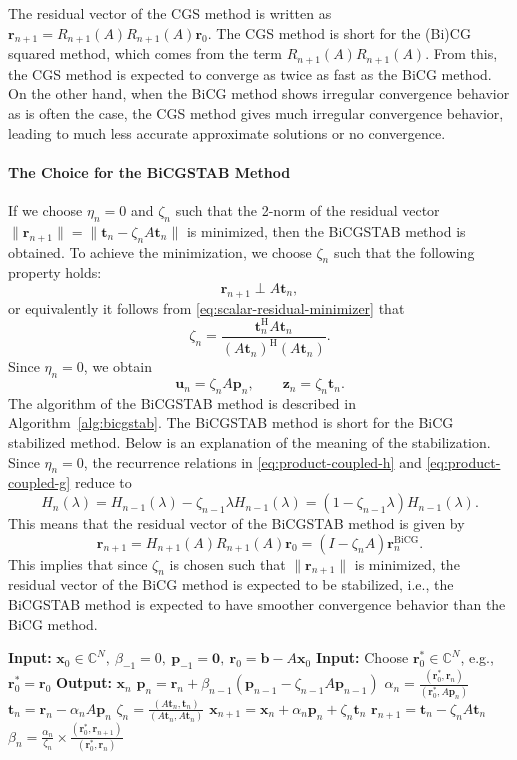{The residual vector of the CGS method is written as $\bm r_{n+1}=R_{n+1}(A)R_{n+1}(A)\bm r_0$. The CGS method is short for the (Bi)CG squared method, which comes from the term $R_{n+1}(A)R_{n+1}(A)$. From this, the CGS method is expected to converge as twice as fast as the BiCG method. On the other hand, when the BiCG method shows irregular convergence behavior as is often the case, the CGS method gives much irregular convergence behavior, leading to much less accurate approximate solutions or no convergence.}
\paragraph{{The Choice for the BiCGSTAB Method}}\label{subsec:bicgstab-parameter-choice}\mbox{}\par
{If we choose $\eta_n=0$ and $\zeta_n$ such that the 2-norm of the residual vector $\|\bm r_{n+1}\|=\|\bm t_n-\zeta_nA\bm t_n\|$ is minimized, then the BiCGSTAB method is obtained. To achieve the minimization, we choose $\zeta_n$ such that the following property holds:}
\[\bm r_{n+1}\perp A\bm t_n,\]
{or equivalently it follows from \eqref{eq:scalar-residual-minimizer} that}
\[\zeta_n=\frac{\bm t_n^{\mathrm H}A\bm t_n}{(A\bm t_n)^{\mathrm H}(A\bm t_n)}.\]
{Since $\eta_n=0$, we obtain}
\[\bm u_n=\zeta_nA\bm p_n,\qquad\bm z_n=\zeta_n\bm t_n.\]
{The algorithm of the BiCGSTAB method is described in Algorithm\ \ref{alg:bicgstab}.}
{The BiCGSTAB method is short for the BiCG stabilized method. Below is an explanation of the meaning of the stabilization. Since $\eta_n=0$, the recurrence relations in \eqref{eq:product-coupled-h} and \eqref{eq:product-coupled-g} reduce to}
\[H_n(\lambda)=H_{n-1}(\lambda)-\zeta_{n-1}\lambda H_{n-1}(\lambda)=(1-\zeta_{n-1}\lambda)H_{n-1}(\lambda).\]
{This means that the residual vector of the BiCGSTAB method is given by}
\[\bm r_{n+1}=H_{n+1}(A)R_{n+1}(A)\bm r_0=(I-\zeta_nA)\bm r_n^{\mathrm{BiCG}}.\]
{This implies that since $\zeta_n$ is chosen such that $\|\bm r_{n+1}\|$ is minimized, the residual vector of the BiCG method is expected to be stabilized, i.e., the BiCGSTAB method is expected to have smoother convergence behavior than the BiCG method.}
\begin{algorithm}[H]\caption{{The BiCGSTAB method}}\label{alg:bicgstab}\begin{algorithmic}[1]
\Statex\textbf{Input:} $\bm x_0\in\mathbb C^N,\ \beta_{-1}=0,\ \bm p_{-1}=\bm0,\ \bm r_0=\bm b-A\bm x_0$
\Statex\textbf{Input:} {Choose $\bm r_0^{*}\in\mathbb C^N$, e.g., $\bm r_0^{*}=\bm r_0$}
\Statex\textbf{Output:} $\bm x_n$
\State $\bm p_n=\bm r_n+\beta_{n-1}(\bm p_{n-1}-\zeta_{n-1}A\bm p_{n-1})$
\State $\alpha_n=\frac{(\bm r_0^{*},\bm r_n)}{(\bm r_0^{*},A\bm p_n)}$
\State $\bm t_n=\bm r_n-\alpha_nA\bm p_n$
\State $\zeta_n=\frac{(A\bm t_n,\bm t_n)}{(A\bm t_n,A\bm t_n)}$
\State $\bm x_{n+1}=\bm x_n+\alpha_n\bm p_n+\zeta_n\bm t_n$
\State $\bm r_{n+1}=\bm t_n-\zeta_nA\bm t_n$
\State $\beta_n=\frac{\alpha_n}{\zeta_n}\times\frac{(\bm r_0^{*},\bm r_{n+1})}{(\bm r_0^{*},\bm r_n)}$
\EndFor\end{algorithmic}\end{algorithm}
